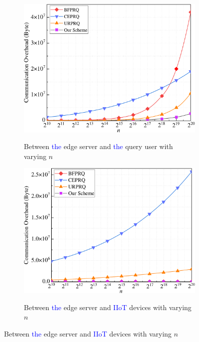 \documentclass[IEEE JOURNAL OF BIOMEDICAL AND HEALTH INFORMATICS]{IEEEtran}
\begin{document}
{\begin{figure}%
	\centering
	\begin{subfigure}[t]{0.23\textwidth}
		\centering
		\includegraphics[width=1\textwidth]{commu_1n}\\
		\caption{Between \textcolor{blue}{the} edge server and \textcolor{blue}{the} query user with varying $n$}\label{commu_1n}	
	\end{subfigure}
	\quad
	\begin{subfigure}[t]{0.23\textwidth}
		\centering
		\includegraphics[width=1\textwidth]{commu_3n}\\
		\caption{Between \textcolor{blue}{the} edge server and \textcolor{blue}{IIoT} devices with varying $n$}\label{commu_3n}
	\end{subfigure}

\end{figure}}
\end{document}
